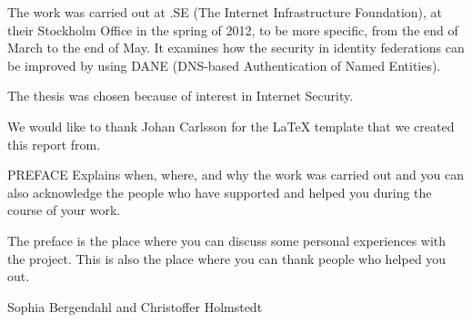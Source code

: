 The work was carried out at .SE (The Internet Infrastructure Foundation), at their  Stockholm Office in the spring of 2012, to be more specific, from the end of March to the end of May. It examines how the security in identity federations can be improved by using DANE (DNS-based Authentication of Named Entities).

The thesis was chosen because of interest in Internet Security.

We would like to thank Johan Carlsson for the LaTeX template that we 
created this report from.







PREFACE Explains when, where, and why the work was carried out and you can also
acknowledge the people who have supported and helped you during the course of your
work.

The preface is the place where you can discuss some personal
experiences with the project. This is also the place where you can
thank people who helped you out.

\vspace*{2cm}%
\hfill Sophia Bergendahl and Christoffer Holmstedt
